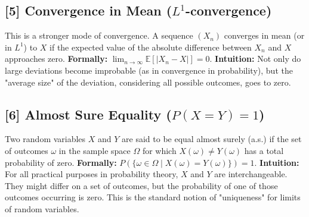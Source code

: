 \documentclass[11pt,a4paper]{article}
\theoremstyle{exercise}
\begin{document}
\subsection*{[5] Convergence in Mean ($L^1$-convergence)}
\label{note:l1-conv}
This is a stronger mode of convergence. A sequence $(X_n)$ converges in mean (or in $L^1$) to $X$ if the expected value of the absolute difference between $X_n$ and $X$ approaches zero.
\textbf{Formally:} $\lim_{n \to \infty} \mathbb{E}[|X_n - X|] = 0$.
\textbf{Intuition:} Not only do large deviations become improbable (as in convergence in probability), but the "average size" of the deviation, considering all possible outcomes, goes to zero.

\subsection*{[6] Almost Sure Equality ($P(X=Y)=1$)}
\label{note:almost-surely}
Two random variables $X$ and $Y$ are said to be equal almost surely (a.s.) if the set of outcomes $\omega$ in the sample space $\Omega$ for which $X(\omega) \neq Y(\omega)$ has a total probability of zero.
\textbf{Formally:} $P(\{\omega \in \Omega \mid X(\omega) = Y(\omega)\}) = 1$.
\textbf{Intuition:} For all practical purposes in probability theory, $X$ and $Y$ are interchangeable. They might differ on a set of outcomes, but the probability of one of those outcomes occurring is zero. This is the standard notion of "uniqueness" for limits of random variables.
\end{document}
